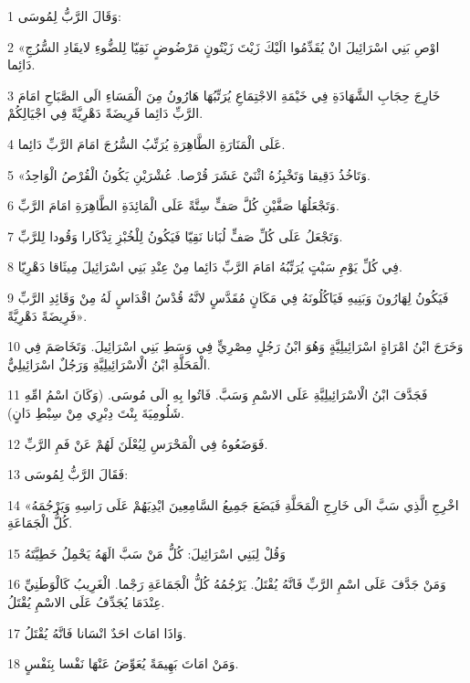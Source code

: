 \par 1 وَقَالَ الرَّبُّ لِمُوسَى:
\par 2 «اوْصِ بَنِي اسْرَائِيلَ انْ يُقَدِّمُوا الَيْكَ زَيْتَ زَيْتُونٍ مَرْضُوضٍ نَقِيّا لِلضُّوءِ لايقَادِ السُّرُجِ دَائِما.
\par 3 خَارِجَ حِجَابِ الشَّهَادَةِ فِي خَيْمَةِ الاجْتِمَاعِ يُرَتِّبُهَا هَارُونُ مِنَ الْمَسَاءِ الَى الصَّبَاحِ امَامَ الرَّبِّ دَائِما فَرِيضَةً دَهْرِيَّةً فِي اجْيَالِكُمْ.
\par 4 عَلَى الْمَنَارَةِ الطَّاهِرَةِ يُرَتِّبُ السُّرُجَ امَامَ الرَّبِّ دَائِما.
\par 5 «وَتَاخُذُ دَقِيقا وَتَخْبِزُهُ اثْنَيْ عَشَرَ قُرْصا. عُشْرَيْنِ يَكُونُ الْقُرْصُ الْوَاحِدُ.
\par 6 وَتَجْعَلُهَا صَفَّيْنِ كُلَّ صَفٍّ سِتَّةً عَلَى الْمَائِدَةِ الطَّاهِرَةِ امَامَ الرَّبِّ.
\par 7 وَتَجْعَلُ عَلَى كُلِّ صَفٍّ لُبَانا نَقِيّا فَيَكُونُ لِلْخُبْزِ تِذْكَارا وَقُودا لِلرَّبِّ.
\par 8 فِي كُلِّ يَوْمِ سَبْتٍ يُرَتِّبُهُ امَامَ الرَّبِّ دَائِما مِنْ عِنْدِ بَنِي اسْرَائِيلَ مِيثَاقا دَهْرِيّا.
\par 9 فَيَكُونُ لِهَارُونَ وَبَنِيهِ فَيَاكُلُونَهُ فِي مَكَانٍ مُقَدَّسٍ لانَّهُ قُدْسُ اقْدَاسٍ لَهُ مِنْ وَقَائِدِ الرَّبِّ فَرِيضَةً دَهْرِيَّةً».
\par 10 وَخَرَجَ ابْنُ امْرَاةٍ اسْرَائِيلِيَّةٍ وَهُوَ ابْنُ رَجُلٍ مِصْرِيٍّ فِي وَسَطِ بَنِي اسْرَائِيلَ. وَتَخَاصَمَ فِي الْمَحَلَّةِ ابْنُ الْاسْرَائِيلِيَّةِ وَرَجُلٌ اسْرَائِيلِيٌّ.
\par 11 فَجَدَّفَ ابْنُ الْاسْرَائِيلِيَّةِ عَلَى الاسْمِ وَسَبَّ. فَاتُوا بِهِ الَى مُوسَى. (وَكَانَ اسْمُ امِّهِ شَلُومِيَةَ بِنْتَ دِبْرِي مِنْ سِبْطِ دَانٍ).
\par 12 فَوَضَعُوهُ فِي الْمَحْرَسِ لِيُعْلَنَ لَهُمْ عَنْ فَمِ الرَّبِّ.
\par 13 فَقَالَ الرَّبُّ لِمُوسَى:
\par 14 «اخْرِجِ الَّذِي سَبَّ الَى خَارِجِ الْمَحَلَّةِ فَيَضَعَ جَمِيعُ السَّامِعِينَ ايْدِيَهُمْ عَلَى رَاسِهِ وَيَرْجُمَهُ كُلُّ الْجَمَاعَةِ.
\par 15 وَقُلْ لِبَنِي اسْرَائِيلَ: كُلُّ مَنْ سَبَّ الَهَهُ يَحْمِلُ خَطِيَّتَهُ
\par 16 وَمَنْ جَدَّفَ عَلَى اسْمِ الرَّبِّ فَانَّهُ يُقْتَلُ. يَرْجُمُهُ كُلُّ الْجَمَاعَةِ رَجْما. الْغَرِيبُ كَالْوَطَنِيِّ عِنْدَمَا يُجَدِّفُ عَلَى الاسْمِ يُقْتَلُ.
\par 17 وَاذَا امَاتَ احَدٌ انْسَانا فَانَّهُ يُقْتَلُ.
\par 18 وَمَنْ امَاتَ بَهِيمَةً يُعَوِّضُ عَنْهَا نَفْسا بِنَفْسٍ.
